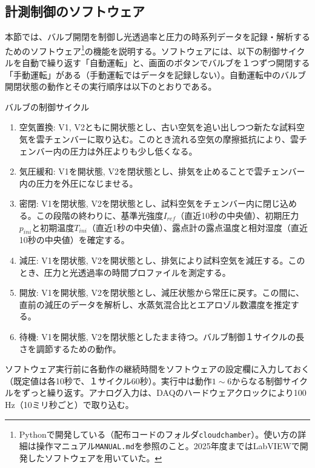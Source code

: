 \documentclass{ltjsarticle}
\begin{document}
\subsection{計測制御のソフトウェア}\label{sec:software}
本節では、バルブ開閉を制御し光透過率と圧力の時系列データを記録・解析するためのソフトウェア\footnote{Pythonで開発している（配布コードのフォルダ\texttt{cloudchamber}）。使い方の詳細は操作マニュアル\texttt{MANUAL.md}を参照のこと。2025年度まではLabVIEWで開発したソフトウェアを用いていた。}の機能を説明する。ソフトウェアには、以下の制御サイクルを自動で繰り返す「自動運転」と、画面のボタンでバルブを１つずつ開閉する「手動運転」がある（手動運転ではデータを記録しない）。自動運転中のバルブ開閉状態の動作とその実行順序は以下のとおりである。
\begin{itembox}[l]{バルブの制御サイクル}
\begin{enumerate}
\item 空気置換: V1, V2ともに開状態とし、古い空気を追い出しつつ新たな試料空気を雲チェンバーに取り込む。このとき流れる空気の摩擦抵抗により、雲チェンバー内の圧力は外圧よりも少し低くなる。
\item 気圧緩和: V1を開状態, V2を閉状態とし、排気を止めることで雲チェンバー内の圧力を外圧になじませる。
\item 密閉: V1を閉状態, V2を閉状態とし、試料空気をチェンバー内に閉じ込める。この段階の終わりに、基準光強度$I_{ref}$（直近10秒の中央値）、初期圧力$p_{ini}$と初期温度$T_{ini}$（直近1秒の中央値）、露点計の露点温度と相対湿度（直近10秒の中央値）を確定する。
\item 減圧: V1を閉状態, V2を開状態とし、排気により試料空気を減圧する。このとき、圧力と光透過率の時間プロファイルを測定する。
\item 開放: V1を開状態, V2を閉状態とし、減圧状態から常圧に戻す。この間に、直前の減圧のデータを解析し、水蒸気混合比とエアロゾル数濃度を推定する。
\item 待機: V1を開状態, V2を閉状態としたまま待つ。バルブ制御１サイクルの長さを調節するための動作。
\end{enumerate}
\end{itembox}
ソフトウェア実行前に各動作の継続時間をソフトウェアの設定欄に入力しておく（既定値は各10秒で、１サイクル60秒）。実行中は動作$1 \sim 6$からなる制御サイクルをずっと繰り返す。アナログ入力は、DAQのハードウェアクロックにより100 Hz（10ミリ秒ごと）で取り込む。
\end{document}
